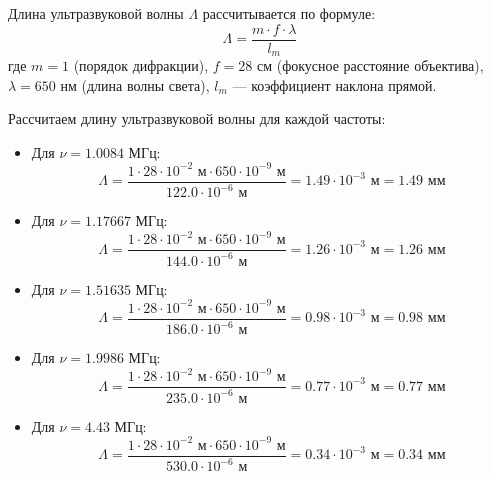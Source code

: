 Длина ультразвуковой волны $\Lambda$ рассчитывается по формуле:
\begin{equation}
    \Lambda = \frac{m \cdot f \cdot \lambda}{l_m}
\end{equation}
где $m = 1$ (порядок дифракции), $f = 28$ см (фокусное расстояние объектива), $\lambda = 650$ нм (длина волны света), $l_m$ — коэффициент наклона прямой.

Рассчитаем длину ультразвуковой волны для каждой частоты:

\begin{itemize}
    \item Для $\nu = 1.0084$ МГц:
    \begin{equation}
        \Lambda = \frac{1 \cdot 28 \cdot 10^{-2} \text{ м} \cdot 650 \cdot 10^{-9} \text{ м}}{122.0 \cdot 10^{-6} \text{ м}} = 1.49 \cdot 10^{-3} \text{ м} = 1.49 \text{ мм}
    \end{equation}
    
    \item Для $\nu = 1.17667$ МГц:
    \begin{equation}
        \Lambda = \frac{1 \cdot 28 \cdot 10^{-2} \text{ м} \cdot 650 \cdot 10^{-9} \text{ м}}{144.0 \cdot 10^{-6} \text{ м}} = 1.26 \cdot 10^{-3} \text{ м} = 1.26 \text{ мм}
    \end{equation}
    
    \item Для $\nu = 1.51635$ МГц:
    \begin{equation}
        \Lambda = \frac{1 \cdot 28 \cdot 10^{-2} \text{ м} \cdot 650 \cdot 10^{-9} \text{ м}}{186.0 \cdot 10^{-6} \text{ м}} = 0.98 \cdot 10^{-3} \text{ м} = 0.98 \text{ мм}
    \end{equation}
    
    \item Для $\nu = 1.9986$ МГц:
    \begin{equation}
        \Lambda = \frac{1 \cdot 28 \cdot 10^{-2} \text{ м} \cdot 650 \cdot 10^{-9} \text{ м}}{235.0 \cdot 10^{-6} \text{ м}} = 0.77 \cdot 10^{-3} \text{ м} = 0.77 \text{ мм}
    \end{equation}
    
    \item Для $\nu = 4.43$ МГц:
    \begin{equation}
        \Lambda = \frac{1 \cdot 28 \cdot 10^{-2} \text{ м} \cdot 650 \cdot 10^{-9} \text{ м}}{530.0 \cdot 10^{-6} \text{ м}} = 0.34 \cdot 10^{-3} \text{ м} = 0.34 \text{ мм}
    \end{equation}
\end{itemize}

